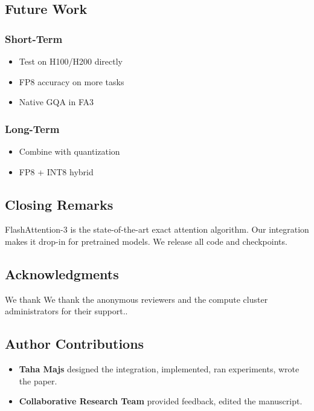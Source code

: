 \subsection{Future Work}

\subsubsection{Short-Term}
\begin{itemize}
\item Test on H100/H200 directly
\item FP8 accuracy on more tasks
\item Native GQA in FA3

\end{itemize}
\subsubsection{Long-Term}
\begin{itemize}
\item Combine with quantization
\item FP8 + INT8 hybrid

\end{itemize}
\subsection{Closing Remarks}

FlashAttention-3 is the state-of-the-art exact attention algorithm. Our 
integration makes it drop-in for pretrained models. We release all code 
and checkpoints.

\subsection{Acknowledgments}

We thank We thank the anonymous reviewers and the compute cluster administrators for their support..

\subsection{Author Contributions}

\begin{itemize}
\item \textbf{Taha Majs} designed the integration, implemented, ran experiments,
  wrote the paper.
\item \textbf{Collaborative Research Team} provided feedback, edited the manuscript.

\end{itemize}
